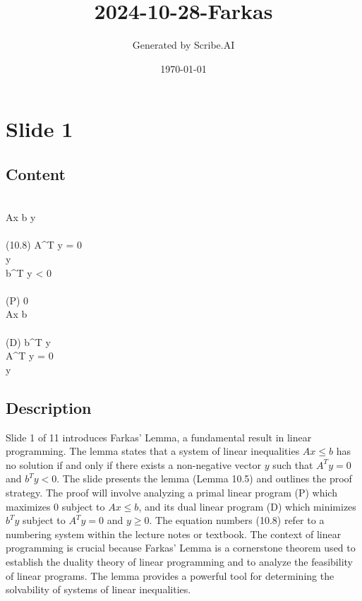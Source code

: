 \documentclass{article}%
\title{2024{-}10{-}28{-}Farkas}%
\author{Generated by Scribe.AI}%
\date{\today}%
\begin{document}
%
\normalsize%
\maketitle%
\section{Slide 1}%
\label{sec:Slide1}%
\subsection{Content}%

 \\
 Ax \le b  y  \\
 \\
(10.8) \quad A^T y = 0 \\
\quad y  \\
\quad b^T y < 0 \\
 \\
(P) \quad {} 0 \\
\quad {} Ax \le b \\
 \\
(D) \quad {} b^T y \\
\quad {} A^T y = 0 \\
\quad y 
%
\subsection{Description}%
Slide 1 of 11 introduces Farkas' Lemma, a fundamental result in linear programming. The lemma states that a system of linear inequalities $Ax \le b$ has no solution if and only if there exists a non-negative vector $y$ such that $A^T y = 0$ and $b^T y < 0$.  The slide presents the lemma (Lemma 10.5) and outlines the proof strategy. The proof will involve analyzing a primal linear program (P) which maximizes 0 subject to $Ax \le b$, and its dual linear program (D) which minimizes $b^T y$ subject to $A^T y = 0$ and $y \ge 0$. The equation numbers (10.8) refer to a numbering system within the lecture notes or textbook. The context of linear programming is crucial because Farkas' Lemma is a cornerstone theorem used to establish the duality theory of linear programming and to analyze the feasibility of linear programs.  The lemma provides a powerful tool for determining the solvability of systems of linear inequalities.%
\end{document}

